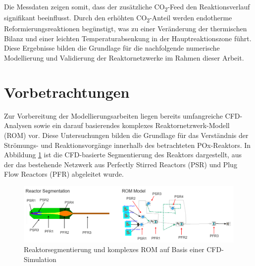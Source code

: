         Die Messdaten zeigen somit, dass der zusätzliche CO\textsubscript{2}-Feed den Reaktionsverlauf signifikant beeinflusst.  
        Durch den erhöhten CO\textsubscript{2}-Anteil werden endotherme Reformierungsreaktionen begünstigt, was zu einer Veränderung der thermischen Bilanz und einer leichten Temperaturabsenkung in der Hauptreaktionszone führt.  
        Diese Ergebnisse bilden die Grundlage für die nachfolgende numerische Modellierung und Validierung der Reaktornetzwerke im Rahmen dieser Arbeit.
    \section{Vorbetrachtungen}
    \label{sec:vorbetrachtungen}
    
        Zur Vorbereitung der Modellierungsarbeiten liegen bereits umfangreiche CFD-Analysen sowie ein darauf basierendes komplexes Reaktornetzwerk-Modell (ROM) vor. 
        Diese Untersuchungen bilden die Grundlage für das Verständnis der Strömungs- und Reaktionsvorgänge innerhalb des betrachteten POx-Reaktors. 
        In Abbildung \ref{fig:reaktorsegmentierung} ist die CFD-basierte Segmentierung des Reaktors dargestellt, aus der das bestehende Netzwerk aus Perfectly Stirred Reactors (PSR) und Plug Flow Reactors (PFR) abgeleitet wurde.
        
        \begin{figure}[H]
            \centering
            \includegraphics[width=1\linewidth]{img/sonstiges/Reactor Segmentation.png}
            \caption{Reaktorsegmentierung und komplexes ROM auf Basis einer CFD-Simulation \cite{gonzales}}
            \label{fig:reaktorsegmentierung}
        \end{figure}
    